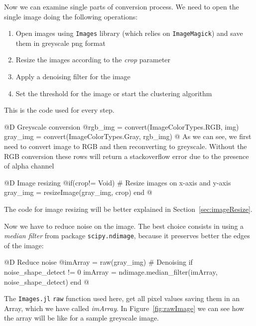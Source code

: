 \documentclass[11pt,oneside]{article}	%
\begin{document}
Now we can examine single parts of conversion process. We need to open the single image doing the following operations:
\begin{enumerate}
 \item Open images using \texttt{Images} library (which relies on \texttt{ImageMagick}) and save them in greyscale png format 
 \item Resize the images according to the \textit{crop} parameter
 \item Apply a denoising filter for the image
 \item Set the threshold for the image or start the clustering algorithm
\end{enumerate}

This is the code used for every step.

@D Greyscale conversion
@{rgb_img = convert(Image{ColorTypes.RGB}, img)
gray_img = convert(Image{ColorTypes.Gray}, rgb_img) @}
As we can see, we first need to convert image to RGB and then reconverting to greyscale. Without the RGB conversion these rows will return a stackoverflow error due to the presence of alpha channel

@D Image resizing
@{if(crop!= Void)
  # Resize images on x-axis and y-axis
  gray_img = resizeImage(gray_img, crop)
end @}

The code for image resizing will be better explained in Section~\ref{sec:imageResize}.

Now we have to reduce noise on the image. The best choice consists in using a \textit{median filter} from package \texttt{scipy.ndimage}, because it preserves better the edges of the image:

@D Reduce noise
@{imArray = raw(gray_img)
# Denoising
if noise_shape_detect != 0
  imArray = ndimage.median_filter(imArray, noise_shape_detect)
end @}

The \texttt{Images.jl} \texttt{raw} function used here, get all pixel values saving them in an Array, which we have called \textit{imArray}. In Figure~\ref{fig:rawImage} we can see how the array will be like for a sample greyscale image.
\end{document}
